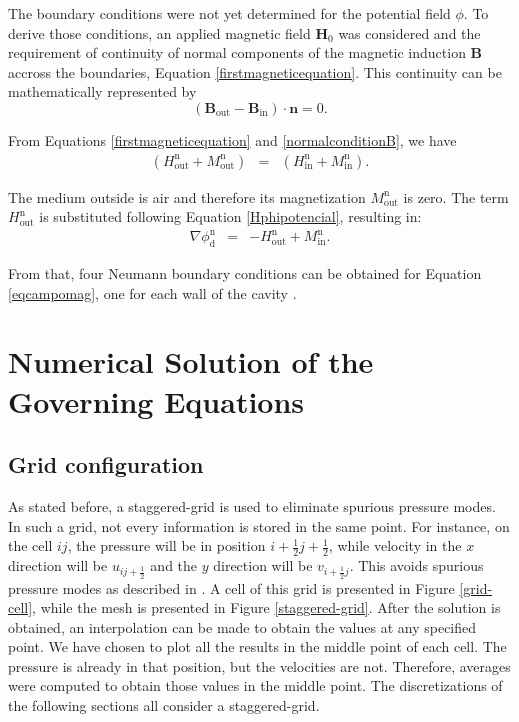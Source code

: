 \documentclass[journal]{IEEEtran}
\begin{document}
The boundary conditions were not yet determined for the potential field $\phi$. To derive those conditions, an applied magnetic field $\mathbf{H}_0$ was considered and the requirement of continuity of normal components of the magnetic induction $\mathbf{B}$ accross the boundaries, Equation \ref{firstmagneticequation}. This continuity can be mathematically represented by \begin{equation}\left(\mathbf{B}_{\mathrm{out}} - \mathbf{B}_{\mathrm{in}}\right)\cdot \mathbf{n} = 0 \label{normalconditionB}.\end{equation} 

From Equations \ref{firstmagneticequation} and \ref{normalconditionB}, we have \begin{eqnarray}
(H_{\mathrm{out}}^{\mathrm{n}} + M_{\mathrm{out}}^{\mathrm{n}}) &=&  (H_{\mathrm{in}}^{\mathrm{n}}+M_{\mathrm{in}}^{\mathrm{n}}).\label{normalConditionB2}
\end{eqnarray}

The medium outside is air and therefore its magnetization $M_{\mathrm{out}}^{\mathrm{n}}$ is zero. The term $H_{\mathrm{out}}^{\mathrm{n}}$ is substituted following  Equation \ref{Hphipotencial}, resulting  in: \begin{eqnarray}
\nabla\phi_{\mathrm{d}}^{\mathrm{n}} & = & -H_{\mathrm{out}}^{\mathrm{n}} + M_{\mathrm{in}}^{\mathrm{n}}. \label{nablaphid}
\end{eqnarray}

From that, four Neumann boundary conditions can be obtained for Equation \ref{eqcampomag}, one for each wall of the cavity \cite{ataias2015}.
\section{Numerical Solution of the Governing Equations}

\subsection{Grid configuration}

As stated before, a staggered-grid is used to eliminate spurious pressure modes. In such a grid, not every information is stored in the same point. For instance, on the cell $ij$, the pressure will be in position $i+\frac{1}{2}j+\frac{1}{2}$, while velocity in the $x$ direction will be $u_{ij+\frac{1}{2}}$ and the $y$ direction will be $v_{i+\frac{1}{2}j}$. This avoids spurious pressure modes as described in \cite{hinchLectureNotes}. A cell of this grid is presented in Figure \ref{grid-cell}, while the mesh is presented in Figure \ref{staggered-grid}. After the solution is obtained, an interpolation can be made to obtain the values at any specified point. We have chosen to plot all the results in the middle point of each cell. The pressure is already in that position, but the velocities are not. Therefore, averages were computed to obtain those values in the middle point. The discretizations of the following sections all consider a staggered-grid.
\end{document}
